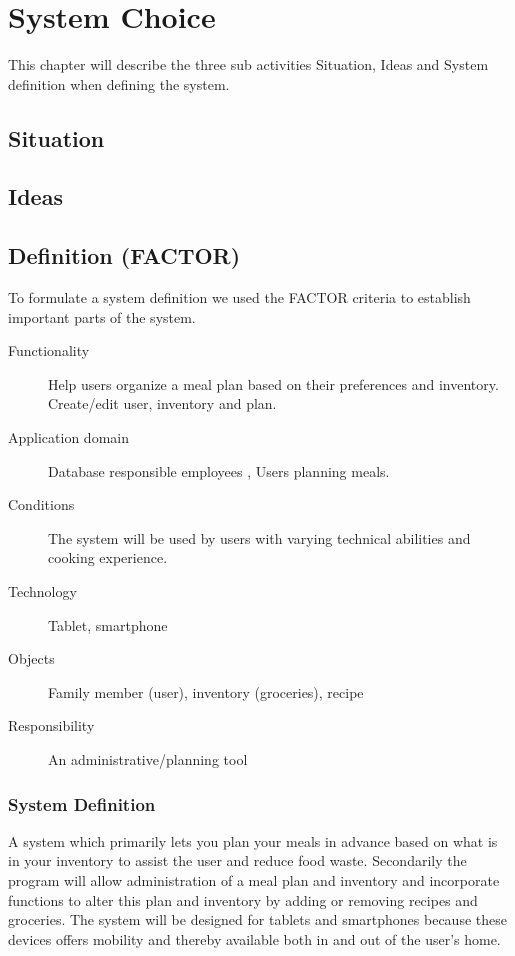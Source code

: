  \chapter{System Choice}
This chapter will describe the three sub activities Situation, Ideas and System definition when defining the system. 
\section{Situation}

\section{Ideas}

\section{Definition (FACTOR)}
To formulate a system definition we used the FACTOR \cite{OOAD_BATOF} criteria to establish important parts of the system.

\begin{description}
	\item[Functionality] Help users organize a meal plan based on their preferences and inventory. Create/edit user, inventory and plan.
	\item[Application domain] Database responsible employees , Users planning meals.
	\item[Conditions] The system will be used by users with varying technical abilities and cooking experience.
	\item[Technology] Tablet, smartphone
	\item[Objects] Family member (user), inventory (groceries), recipe
	\item[Responsibility] An administrative/planning tool
\end{description}

\subsection{System Definition}
A system which primarily lets you plan your meals in advance based on what is in your inventory to assist the user and reduce food waste. Secondarily the program will allow administration of a meal plan and inventory and incorporate functions to alter this plan and inventory by adding or removing recipes and groceries. The system will be designed for tablets and smartphones because these devices offers mobility and thereby available both in and out of the user’s home.
